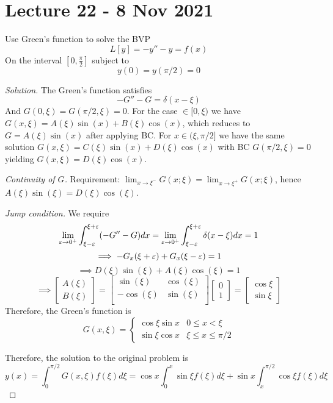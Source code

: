 \section{Lecture 22 - 8 Nov 2021}
\begin{example}
  Use Green's function to solve the BVP 
  \[L[y]=-y''-y=f(x)\]
  On the interval $[0,\frac{\pi}{2}]$ subject to 
  \[y(0)=y(\pi/2)=0\]
\end{example}
\begin{proof}[Solution]
  The Green's function satisfies 
  \[-G''-G=\delta(x-\xi)\]
  And $G(0,\xi)=G(\pi/2,\xi)=0$. For the case $\in [0,\xi)$ we have
  $G(x,\xi)=A(\xi)\sin(x)+B(\xi)\cos(x)$, which reduces to $G=A(\xi)\sin(x)$ after
  applying BC. For $x\in (\xi,\pi/2]$ we have the same solution
  $G(x,\xi)=C(\xi)\sin(x)+D(\xi)\cos(x)$ with BC $G(\pi/2,\xi)=0$ yielding
  $G(x,\xi)=D(\xi)\cos(x)$.

  \emph{Continuity of $G$.} Requirement:
  $\lim_{x\to\xi^-}G(x;\xi)=\lim_{x\to\xi^+}G(x;\xi)$, hence
  $A(\xi)\sin(\xi)=D(\xi)\cos(\xi)$.

  \emph{Jump condition. } We require 
  \[\lim_{\varepsilon\to 0^+}\int_{\xi-\varepsilon}^{\xi+\varepsilon} (-G''-G)dx = \lim_{\varepsilon\to
  0^+}\int_{\xi-\varepsilon}^{\xi+\varepsilon} \delta(x-\xi) dx = 1\]
  \[\implies - G_x(\xi+\varepsilon) + G_x(\xi-\varepsilon) = 1\]
  \[\implies D(\xi)\sin(\xi) + A(\xi)\cos(\xi) =1\]
  \[\implies 
    \begin{bmatrix}
      A(\xi) \\
      B(\xi)
    \end{bmatrix} = 
    \begin{bmatrix}
      \sin(\xi) & \cos(\xi) \\
      -\cos(\xi) & \sin(\xi) \\
    \end{bmatrix}
    \begin{bmatrix}
      0\\
      1
    \end{bmatrix}=
    \begin{bmatrix}
      \cos \xi \\ 
      \sin \xi
    \end{bmatrix}
  \]
  Therefore, the Green's function is
  \[G(x,\xi)= 
    \begin{cases}
      \cos\xi \sin x & 0\le x < \xi \\
      \sin\xi \cos x & \xi\le x \le \pi/2
    \end{cases}
  \]

  Therefore, the solution to the original problem is
  \[y(x)=\int_{0}^{\pi/2} G(x,\xi)f(\xi) d\xi= \cos x \int_{0}^x \sin\xi f(\xi)d\xi +
  \sin x \int_x^{\pi/2}\cos\xi f(\xi) d\xi\]
\end{proof}

